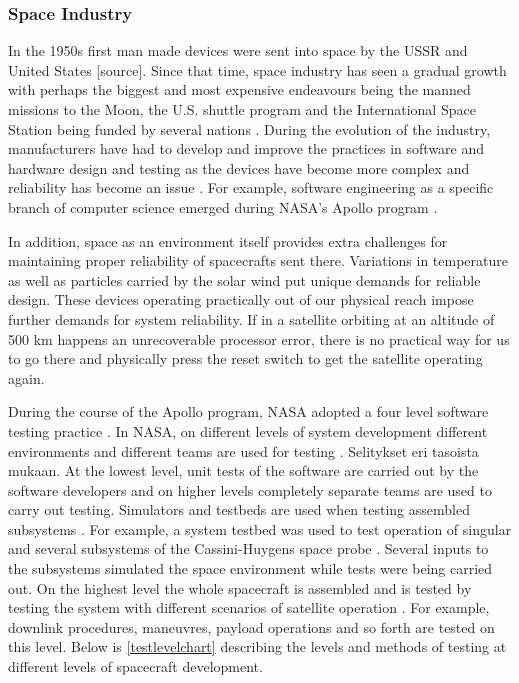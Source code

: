 \documentclass[english,12pt,a4paper,pdftex,elec,utf8]{aaltothesis}
\begin{document}
\subsubsection{Space Industry}
In the 1950s first man made devices were sent into space by the USSR and United States [source]. Since that time, space industry has seen a gradual growth with perhaps the biggest and most expensive endeavours being the manned missions to the Moon, the U.S. shuttle program and the International Space Station being funded by several nations \cite{nasacosts}. During the evolution of the industry, manufacturers have had to develop and improve the practices in software and hardware design and testing as the devices have become more complex and reliability has become an issue \cite{compinspace}. For example, software engineering as a specific branch of computer science emerged during NASA's Apollo program \cite{compinspace}.\par 
In addition, space as an environment itself provides extra challenges for maintaining proper reliability of spacecrafts sent there. Variations in temperature as well as particles carried by the solar wind put unique demands for reliable design. These devices operating practically out of our physical reach impose further demands for system reliability. If in a satellite orbiting at an altitude of 500 km happens an unrecoverable processor error, there is no practical way for us to go there and physically press the reset switch to get the satellite operating again. \cite{spacesystemsengineering} \par
During the course of the Apollo program, NASA adopted a four level software testing practice \cite{compinspace}. In NASA, on different levels of system development different environments and different teams are used for testing \cite{softacceptancespace}. Selitykset eri tasoista \cite{softacceptancespace} mukaan. At the lowest level, unit tests of the software are carried out by the software developers and on higher levels completely separate teams are used to carry out testing. Simulators and testbeds are used when testing assembled subsystems \cite{softacceptancespace, cassinitestbed}. For example, a system testbed was used to test operation of singular and several subsystems of the Cassini-Huygens space probe \cite{cassinitestbed}. Several inputs to the subsystems simulated the space environment while tests were being carried out. On the highest level the whole spacecraft is assembled and is tested by testing the system with different scenarios of satellite operation \cite{softacceptancespace, tor}. For example, downlink procedures, maneuvres, payload operations and so forth are tested on this level. Below is \ref{testlevelchart} describing the levels and methods of testing at different levels of spacecraft development. \par
\end{document}
